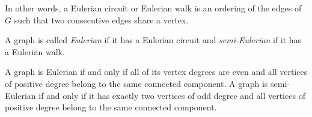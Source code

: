 \begin{page}
\setcounter{section}{1}
\setcounter{subsection}{6}
\setcounter{dfn}{19}
\label{portion:203}

In other words, a Eulerian circuit or Eulerian walk is an ordering of the edges of $G$
such that two consecutive edges share a vertex.

A graph is called \emph{Eulerian} if it has a Eulerian circuit and \emph{semi-Eulerian} if it has a Eulerian walk.


\end{page}

\begin{page}
\setcounter{section}{1}
\setcounter{subsection}{6}
\setcounter{dfn}{20}
\label{portion:205}

\begin{thm}
A graph is Eulerian if and only if all of its vertex degrees are even
and all vertices of positive degree belong to the same connected component.
A graph is semi-Eulerian if and only if it has exactly two vertices of odd degree
and all vertices of positive degree belong to the same connected component.
\end{thm}

\end{page}

